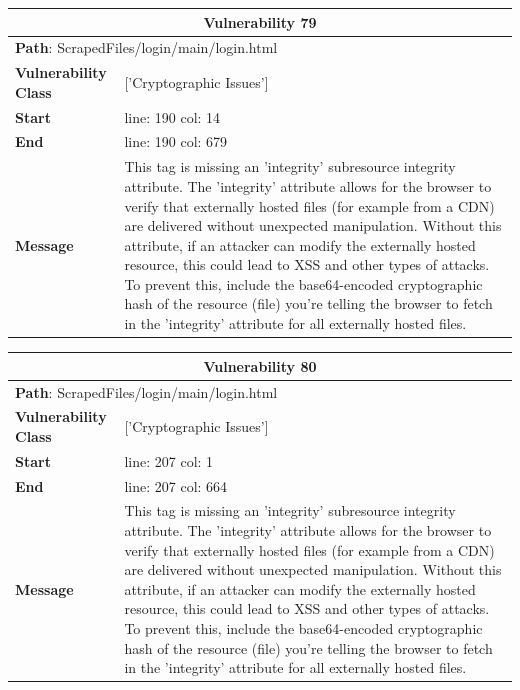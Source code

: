 \documentclass[12pt]{article}
\begin{document}
\vspace{0.7cm}
\FloatBarrier
\begin{table}[!h]
\centering
\renewcommand{\arraystretch}{1.3}
\begin{tabular}{|l|p{10cm}|}
\hline
\multicolumn{2}{|c|}{\textbf{Vulnerability 79}} \\
\hline
\multicolumn{2}{|l|}{\textbf{Path}: ScrapedFiles/login/main/login.html} \\
\hline
\textbf{Vulnerability Class} & ['Cryptographic Issues'] \\
\hline
\textbf{Start} & line: 190 \quad col: 14 \\
\hline
\textbf{End} & line: 190 \quad col: 679 \\
\hline
\textbf{Message} & This tag is missing an 'integrity' subresource integrity attribute. The 'integrity' attribute allows for the browser to verify that externally hosted files (for example from a CDN) are delivered without unexpected manipulation. Without this attribute, if an attacker can modify the externally hosted resource, this could lead to XSS and other types of attacks. To prevent this, include the base64-encoded cryptographic hash of the resource (file) you're telling the browser to fetch in the 'integrity' attribute for all externally hosted files. \\
\hline
\end{tabular}
\end{table}
\vspace{0.7cm}
\FloatBarrier
\begin{table}[!h]
\centering
\renewcommand{\arraystretch}{1.3}
\begin{tabular}{|l|p{10cm}|}
\hline
\multicolumn{2}{|c|}{\textbf{Vulnerability 80}} \\
\hline
\multicolumn{2}{|l|}{\textbf{Path}: ScrapedFiles/login/main/login.html} \\
\hline
\textbf{Vulnerability Class} & ['Cryptographic Issues'] \\
\hline
\textbf{Start} & line: 207 \quad col: 1 \\
\hline
\textbf{End} & line: 207 \quad col: 664 \\
\hline
\textbf{Message} & This tag is missing an 'integrity' subresource integrity attribute. The 'integrity' attribute allows for the browser to verify that externally hosted files (for example from a CDN) are delivered without unexpected manipulation. Without this attribute, if an attacker can modify the externally hosted resource, this could lead to XSS and other types of attacks. To prevent this, include the base64-encoded cryptographic hash of the resource (file) you're telling the browser to fetch in the 'integrity' attribute for all externally hosted files. \\
\hline
\end{tabular}
\end{table}
\end{document}
